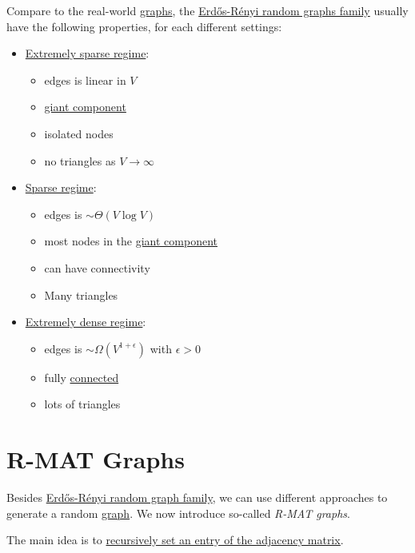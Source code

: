Compare to the real-world \hyperref[def:graph]{graphs}, the \hyperref[sec:Erdos-Renyi-random-graphs-family]{Erdős-Rényi random graphs family}
usually have the following properties, for each different settings:
\begin{itemize}
	\item \hyperref[subsec:extremely-sparse-regime]{Extremely sparse regime}:
	      \begin{itemize}
		      \item edges is linear in \(V\)
		      \item \hyperref[def:giant-component]{giant component}
		      \item isolated nodes
		      \item no triangles as \(V\to \infty \)
	      \end{itemize}
	\item \hyperref[subsec:sparse-regime]{Sparse regime}:
	      \begin{itemize}
		      \item edges is \(\sim \Theta(V\log V)\)
		      \item most nodes in the \hyperref[def:giant-component]{giant component}
		      \item can have connectivity
		      \item Many triangles
	      \end{itemize}
	\item \hyperref[subsec:extremely-dense-regime]{Extremely dense regime}:
	      \begin{itemize}
		      \item edges is \(\sim \Omega(V^{1+\epsilon})\) with \(\epsilon>0\)
		      \item fully \hyperref[def:connected]{connected}
		      \item lots of triangles
	      \end{itemize}
\end{itemize}

\section{R-MAT Graphs}\label{sec:R-MAT-graphs}
Besides \hyperref[sec:Erdos-Renyi-random-graphs-family]{Erdős-Rényi random graph family}, we can use different approaches to generate a
random \hyperref[def:graph]{graph}. We now introduce so-called \emph{R-MAT graphs}.

\begin{intuition}
	The main idea is to \underline{recursively set an entry of the \hyperref[def:adjacency-matrix]{adjacency matrix}}.
\end{intuition}

